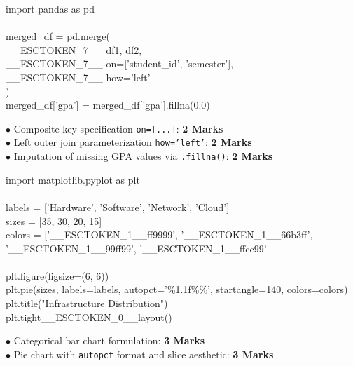 \begin{solutionbox}
\begin{pycode}
import pandas as pd\\
~\\
merged\_df = pd.merge(\\
\_\_ESCTOKEN\_7\_\_ df1, df2,\\
\_\_ESCTOKEN\_7\_\_ on=['student\_id', 'semester'],\\
\_\_ESCTOKEN\_7\_\_ how='left'\\
)\\
merged\_df['gpa'] = merged\_df['gpa'].fillna(0.0)
\end{pycode}
\begin{markingrubric}
$\bullet$ Composite key specification \texttt{on=[...]}: \textbf{2 Marks}\\
$\bullet$ Left outer join parameterization \texttt{how='left'}: \textbf{2 Marks}\\
$\bullet$ Imputation of missing GPA values via \texttt{.fillna()}: \textbf{2 Marks}
\end{markingrubric}
\end{solutionbox}

\begin{solutionbox}
\begin{pycode}
import matplotlib.pyplot as plt\\
~\\
labels = ['Hardware', 'Software', 'Network', 'Cloud']\\
sizes = [35, 30, 20, 15]\\
colors = ['\_\_ESCTOKEN\_1\_\_ff9999', '\_\_ESCTOKEN\_1\_\_66b3ff', '\_\_ESCTOKEN\_1\_\_99ff99', '\_\_ESCTOKEN\_1\_\_ffcc99']\\
~\\
plt.figure(figsize=(6, 6))\\
plt.pie(sizes, labels=labels, autopct='\%1.1f\%\%', startangle=140, colors=colors)\\
plt.title("Infrastructure Distribution")\\
plt.tight\_\_ESCTOKEN\_0\_\_layout()
\end{pycode}
\begin{markingrubric}
$\bullet$ Categorical bar chart formulation: \textbf{3 Marks}\\
$\bullet$ Pie chart with \texttt{autopct} format and slice aesthetic: \textbf{3 Marks}
\end{markingrubric}
\end{solutionbox}

\newpage
